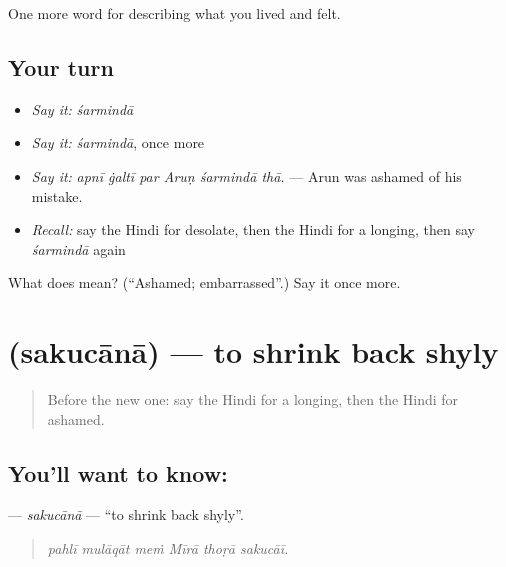 \begin{grammarlens}[title={What you've built}]
One more word for describing what you lived and felt.
\end{grammarlens}

\subsection*{Your turn}
\begin{itemize}
\raggedright
  \item \emph{Say it:} \emph{śarmindā}
  \item \emph{Say it:} \emph{śarmindā}, once more
  \item \emph{Say it:} \emph{apnī ġaltī par Aruṇ śarmindā thā.} — Arun was ashamed of his mistake.
  \item \emph{Recall:} say the Hindi for desolate, then the Hindi for a longing, then say \emph{śarmindā} again
\end{itemize}

\begin{tcolorbox}[breakable,colback=teal!4,colframe=teal!35!black,title={Before you move on}]
What does  mean? (\textquotedblleft{}Ashamed; embarrassed\textquotedblright{}.) Say it once more.
\end{tcolorbox}
\section[\texorpdfstring{\hi{सकुचाना} (sakucānā)}{सकुचाना (sakucānā)}]{ (sakucānā) — to shrink back shyly}

\label{lesson:HI-C461-sakucana}



\begin{quote}
Before the new one: say the Hindi for a longing, then the Hindi for ashamed.
\end{quote}

\subsection*{You'll want to know: }
\textbf{} — \emph{sakucānā} — \textquotedblleft{}to shrink back shyly\textquotedblright{}.

\begin{quote}
     
\end{quote}

\begin{quote}
\emph{pahlī mulāqāt meṁ Mīrā thoṛā sakucāī.}
\end{quote}

